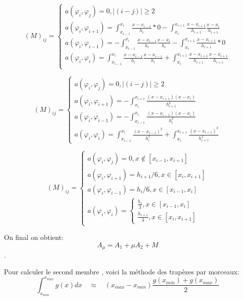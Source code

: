 \documentclass[12pt]{article}
\begin{document}
$$
(M)_{ij} = 
\begin{cases}
a(\varphi_{i},\varphi_{j}) = 0 ,    |(i-j)| \ge 2 \\
a(\varphi_{i},\varphi_{i+1}) =  
\int_{x_{i-1}}^{x_{i}} \frac{x-x_{i-1}}{h_{i}}*0  -\int_{x_{i}}^{x_{i+1}} \frac{x-x_{i+1}}{h_{i+1}}\frac{x-x_{i}}{h_{i+1}}  \\
a(\varphi_{i},\varphi_{i-1}) = 
-\int_{x_{i-1}}^{x_{i}} \frac{x-x_{i-1}}{h_{i}}\frac{x-x_{i}}{h_{i}}  -\int_{x_{i}}^{x_{i+1}}\frac{x-x_{i+1}}{h_{i+1}}*0  \\
a(\varphi_{i},\varphi_{i}) = 
\int_{x_{i-1}}^{x_{i}} \frac{x-x_{i-1}}{h_{i}}\frac{x-x_{i-1}}{h_{i}} + \int_{x_{i}}^{x_{i+1}} \frac{x-x_{i+1}}{h_{i+1}}\frac{x-x_{i+1}}{h_{i+1}}  \\
\end{cases}
$$


$$
(M)_{ij} = 
\begin{cases}
a(\varphi_{i},\varphi_{j}) = 0 ,    |(i-j)| \ge 2 \\
a(\varphi_{i},\varphi_{i+1}) = -\int_{x_{i}}^{x_{i+1}} \frac{(x-x_{i+1})(x-x_{i})}{h_{i+1}^2} \\
a(\varphi_{i},\varphi_{i-1}) =-\int_{x_{i-1}}^{x_{i}} \frac{(x-x_{i-1})(x-x_{i})}{h_{i}^2}  \\
a(\varphi_{i},\varphi_{i}) = 
\int_{x_{i-1}}^{x_{i}} \frac{(x-x_{i-1})^2}{h_{i}^2} + \int_{x_{i}}^{x_{i+1}} \frac{(x-x_{i+1})^2}{h_{i+1}^2}  
\end{cases}
$$


$$
(M)_{ij} = 
\begin{cases}
a(\varphi_{i},\varphi_{j}) = 0 ,    x \notin [x_{i-1},x_{i+1}] \\
a(\varphi_{i},\varphi_{i+1}) = h_{i+1}/6  , x \in [x_{i},x_{i+1}]\\
a(\varphi_{i},\varphi_{i-1}) = h_{i}/6  , x \in [x_{i-1},x_{i}]   \\
a(\varphi_{i},\varphi_{i}) =  
\begin{cases}
\frac{h_{i}}{3} , x \in [x_{i-1},x_{i}] \\
\frac{h_{i+1}}{3} , x \in [x_{i},x_{i+1}] 
\end{cases}
\end{cases}
$$

On final on obtient:  $$A_{\mu} = A_{1} + \mu A_{2} + M $$ .


Pour calculer le second membre , voici la méthode des trapèzes par morceaux: 
$$
\int_{x_{min}}^{x_{max}} g(x) dx\quad \approx\quad (x_{max} -x_{min} ) \frac{g(x_{min})
+ g(x_{max})}{2}
$$ 
\end{document}
